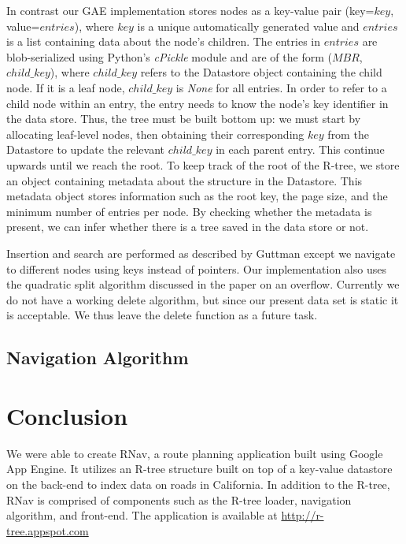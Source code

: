 \documentclass{scrartcl}
\newcommand{\TODO}[1]{\textcolor{red}{\boxed{\mathbf{TODO }} {\textit{#1}} }}
\begin{document}
In contrast our GAE implementation stores nodes as a key-value pair (key=$key$, value=$entries$), where $key$ is a unique automatically generated value and $entries$ is a list containing data about the node's children. The entries in $entries$ are blob-serialized using Python's \textit{cPickle} module and are of the form ($MBR$, $child\_key$), where $child\_key$ refers to the Datastore object containing the child node. If it is a leaf node, $child\_key$ is \textit{None} for all entries. In order to refer to a child node within an entry, the entry needs to know the node's key identifier in the data store. Thus, the tree must be built bottom up: we must start by allocating leaf-level nodes, then obtaining their corresponding $key$ from the Datastore to update the relevant $child\_key$ in each parent entry. This continue upwards until we reach the root. To keep track of the root of the R-tree, we store an object containing metadata about the structure in the Datastore. This metadata object stores information such as the root key, the page size, and the minimum number of entries per node. By checking whether the metadata is present, we can infer whether there is a tree saved in the data store or not.

Insertion and search are performed as described by Guttman\cite{DBLP:conf/sigmod/Guttman84} except we navigate to different nodes using keys instead of pointers. Our implementation also uses the quadratic split algorithm discussed in the paper on an overflow. Currently we do not have a working delete algorithm, but since our present data set is static it is acceptable. We thus leave the delete function as a future task.


\subsection{Navigation Algorithm}



\section{Conclusion}
We were able to create RNav, a route planning application built using Google App Engine. It utilizes an R-tree structure built on top of a key-value datastore on the back-end to index data on roads in California. In addition to the R-tree, RNav is comprised of components such as the R-tree loader, navigation algorithm, and front-end. The application is available at \url{http://r-tree.appspot.com}



\end{document}
